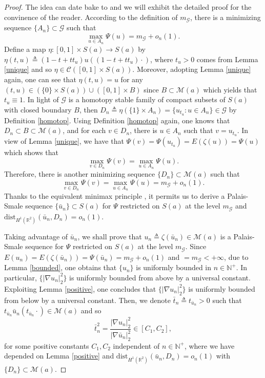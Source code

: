 \documentclass[11pt]{amsart}
\numberwithin{equation}{section}
\theoremstyle{definition}
\newcommand{\R}{\mathbb{R}}
\begin{document}
\begin{proof}
The idea can date bake to \cite{BartschSoave2} and we will exhibit the detailed proof for the convinence
of the reader. According to the definition of $m_\mathcal{G}$,
there is a minimizing sequence $\{A_n\}\subset \mathcal{G}$ such that
\[
\max_{u\in A_n}\Psi(u)=m_\mathcal{G}+o_n(1).
\]
Define a map $\eta:[0,1]\times S(a)\to S(a)$ by $\eta(t,u)\triangleq (1-t+tt_u)u((1-t+tt_u)\cdot)$,
where $t_u>0$ comes from Lemma \ref{unique} and so $\eta\in \mathcal{C}([0,1]\times S(a))$.
Moreover, adopting Lemma \ref{unique} again, one can see that
$\eta(t,u)=u$ for any $(t,u)\in(\{0\}\times S(a))\cup([0,1]\times B)$ since $B\subset \mathcal{M}(a)$ which
yields that $t_u\equiv1$.
In light of
 $\mathcal{G}$ is a homotopy stable family of compact subsets of $S(a)$ with closed boundary $B$,
then $D_n\triangleq \eta(\{1\}\times A_n)=\{u_{t_u}:u\in A_n\}\in \mathcal{G}$ by Definition \ref{homotop}.
 Using Definition \ref{homotop} again, one knows that $D_n\subset B\subset \mathcal{M}(a)$,
and for each $v\in D_n$, there is $u\in A_n$ such that $v=u_{t_u}$.
In view of Lemma \ref{unique}, we have that
$\Psi(v)=\Psi(u_{t_u})=E(\zeta(u))=\Psi(u)$ which shows that
\[
\max_{v\in D_n}\Psi(v)=\max_{u\in A_n}\Psi(u).
\]
Therefore, there is another minimizing sequence $\{D_n\}\subset \mathcal{M}(a)$ such that
 \[
\max_{v\in D_n}\Psi(v)=\max_{u\in A_n}\Psi(u)=m_\mathcal{G}+o_n(1).
\]
Thanks to the equivalent minimax principle \cite[Theorem 3.2]{Ghoussoub},
it permits us to derive a Palais-Smale sequence $\{\bar{u}_n\}\subset S(a)$ for $\Psi$ restricted on $S(a)$
at the level $m_\mathcal{G}$ and $\text{dist}_{H^1(\R^2)}(\bar{u}_n,D_n)=o_n(1)$.

Taking advantage of $\bar{u}_n$, we shall prove that $u_n\triangleq\zeta(\bar{u}_n)\in\mathcal{M}(a)$
is a Palais-Smale sequence for $\Psi$ restricted on $S(a)$
at the level $m_\mathcal{G}$. Since $E(u_n)=E(\zeta(\bar{u}_n))=\Psi(\bar{u}_n)=m_\mathcal{G}+o_n(1)$
and $=m_\mathcal{G}<+\infty$, due to Lemma \ref{bounded}, one obtains that $\{u_n\}$ is uniformly bounded in
$n\in \mathbb{N}^+$. In particular, $\{|\nabla u_n|_2^2\}$ is uniformly bounded from above by a universal constant.
 Exploiting Lemma \ref{positive}, one concludes that $\{|\nabla u_n|_2^2\}$ is uniformly bounded from below by a universal constant.
Then, we
denote $\bar{t}_n\triangleq t_{\bar{u}_n}>0$ such that
$t_{\bar{u}_n}\bar{u}_n (t_{\bar{u}_n} \cdot)\in\mathcal{M}(a)$ and so
\[
\bar{t}_n^2=\frac{|\nabla u_n|_2^2}{|\nabla \bar{u}_n|_2^2}\in[C_1,C_2],
\]
for some positive constants $C_1,C_2$ independent of $n\in \mathbb{N}^+$,
where we have depended on
  Lemma \ref{positive} and $\text{dist}_{H^1(\R^2)}(\bar{u}_n,D_n)=o_n(1)$
with $\{D_n\}\subset \mathcal{M}(a)$.


\end{proof}
\end{document}
